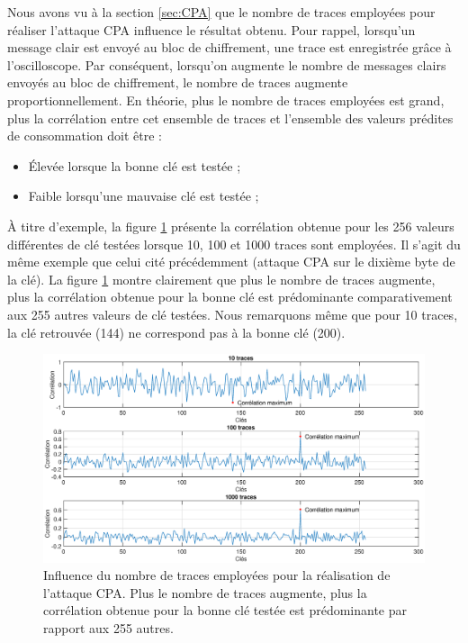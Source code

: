 \documentclass[oneside]{book}
\begin{document}
Nous avons vu à la section \ref{sec:CPA} que le nombre de traces employées pour réaliser l'attaque CPA influence le résultat obtenu. Pour rappel, lorsqu'un message clair est envoyé au bloc de chiffrement, une trace est enregistrée grâce à l'oscilloscope. Par conséquent, lorsqu'on augmente le nombre de messages clairs envoyés au bloc de chiffrement, le nombre de traces augmente proportionnellement. En théorie, plus le nombre de traces employées est grand, plus la corrélation entre cet ensemble de traces et l'ensemble des valeurs prédites de consommation doit être :
\begin{itemize}
\item Élevée lorsque la bonne clé est testée ;
\item Faible lorsqu'une mauvaise clé est testée ;
\end{itemize}
À titre d'exemple, la figure \ref{fig:sim_nb_traces} présente la corrélation obtenue pour les 256 valeurs différentes de clé testées lorsque 10, 100 et 1000 traces sont employées. Il s'agit du même exemple que celui cité précédemment (attaque CPA sur le dixième byte de la clé). La figure \ref{fig:sim_nb_traces} montre clairement que plus le nombre de traces augmente, plus la corrélation obtenue pour la bonne clé est prédominante comparativement aux 255 autres valeurs de clé testées. Nous remarquons même que pour 10 traces, la clé retrouvée (144) ne correspond pas à la bonne clé (200).

\begin{figure}[htbp]
    \hspace{-3.3cm}
    \includegraphics[scale=0.45]{image/sim_nb_traces}
    \caption{Influence du nombre de traces employées pour la réalisation de l'attaque CPA. Plus le nombre de traces augmente, plus la corrélation obtenue pour la bonne clé testée est prédominante par rapport aux 255 autres.}
    \label{fig:sim_nb_traces} 
\end{figure}
\end{document}
